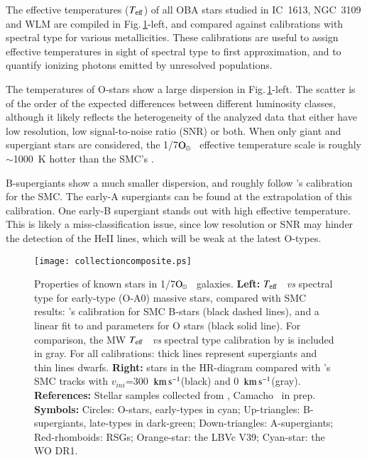 \documentclass{iau}
\newcommand{\Osun}{$\rm O_{\odot}$}
\newcommand{\Teff}{\mbox{$T_{\rm eff}$}}
\newcommand{\teff}{\mbox{$T_{\rm eff}$}}
\newcommand{\vini}{$v_{ini}$}
\newcommand{\kms}{~$\rm km \, s^{-1}$}
\begin{document}
The effective temperatures (\teff) of all OBA stars studied in IC~1613, NGC~3109 and WLM
are compiled in Fig.\,\ref{F:HRD}-left, and compared against calibrations with spectral type
for various metallicities.
These calibrations are useful to assign effective temperatures
in sight of spectral type to first approximation,
and to quantify ionizing photons emitted by unresolved populations.

The temperatures of O-stars show a large dispersion in Fig.\,\ref{F:HRD}-left.
The scatter is of the order of the expected differences between different luminosity
classes, although it likely reflects the heterogeneity of the analyzed data that either
have low resolution, low signal-to-noise ratio (SNR) or both.
When only giant and supergiant stars are considered, the 1/7\Osun~ effective temperature scale
is roughly $\sim$1000~K hotter than the SMC's \citep{GH13a}.

B-supergiants show a much smaller dispersion, and roughly follow
\citet{Tral07}'s calibration for the SMC. The early-A supergiants
can be found at the extrapolation of this calibration.
One early-B supergiant stands out with high
effective temperature. This is likely a miss-classification issue,
since low resolution or SNR may hinder the detection of the
HeII lines, which will be weak at the latest O-types.



\begin{figure}[t]
\begin{center}
 \texttt{[image: collectioncomposite.ps]} 
 \caption{Properties of known stars in 1/7\Osun~ galaxies.
   \textbf{Left:} \Teff~ \textit{vs} spectral type for early-type (O-A0) massive stars,
   compared with SMC results: \citet{Tral07}'s calibration for SMC B-stars (black dashed lines),
   and a linear fit to \citet{Mal07b} and \citet{PMal09} parameters for O stars (black solid line).
   For comparison, the MW \Teff~ \textit{vs} spectral type calibration by \citet{MSH05} is included in gray.
   For all calibrations: thick lines represent supergiants and thin lines dwarfs.
   \textbf{Right:} stars in the HR-diagram compared with \citet{Brott1}'s SMC tracks with \vini=300\kms (black) and 0\kms (gray).
   {\bf References:} Stellar samples collected from
   \citet[][in prep.]{Bal07,Eal07,Tal07,GH13a,Tal13,Tal14,Hal14,Bal15,Hal10,Hal12}, Camacho \etal\ in prep.
         {\bf Symbols:} Circles: O-stars, early-types in cyan; Up-triangles: B-supergiants, late-types in dark-green;
         Down-triangles: A-supergiants; Red-rhomboids: RSGs; Orange-star: the LBVc V39; Cyan-star: the WO DR1.
 }
   \label{F:HRD}
\end{center}
\end{figure}
\end{document}
